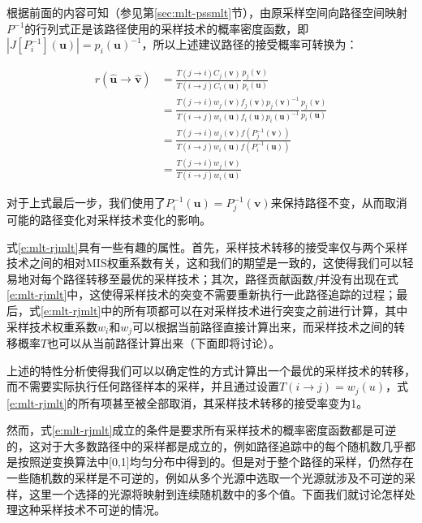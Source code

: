 根据前面的内容可知（参见第\ref{sec:mlt-pssmlt}节），由原采样空间向路径空间映射$P^{-1}$的行列式正是该路径使用的采样技术的概率密度函数，即$|J[P^{-1}_i](\mathbf{u})|=p_i(\mathbf{u})^{-1}$，所以上述建议路径的接受概率可转换为：

\begin{equation}\label{e:mlt-rjmlt}
\begin{aligned}
	r(\hat{\mathbf{u}}\to\hat{\mathbf{v}})&=\frac{T(j\to i)C_j({\mathbf{v}})}{T(i\to j)C_i({\mathbf{u}})}\frac{p_j({\mathbf{v}})}{p_i({\mathbf{u}})}\\
	&=\frac{T(j\to i)w_j({\mathbf{v}})f_j({\mathbf{v}})p_j({\mathbf{v}})^{-1}}{T(i\to j)w_i({\mathbf{u}})f_i({\mathbf{u}})p_i({\mathbf{u}})^{-1}}\frac{p_j({\mathbf{v}})}{p_i({\mathbf{u}})}\\
	&=\frac{T(j\to i)w_j({\mathbf{v}})f(P^{-1}_j({\mathbf{v}}))}{T(i\to j)w_i({\mathbf{u}})f(P^{-1}_i({\mathbf{u}}))}\\
	&=\frac{T(j\to i)w_j({\mathbf{v}})}{T(i\to j)w_i({\mathbf{u}})}
\end{aligned}
\end{equation}

\noindent 对于上式最后一步，我们使用了$P^{-1}_i({\mathbf{u}})=P^{-1}_j({\mathbf{v}})$来保持路径不变，从而取消可能的路径变化对采样技术变化的影响。

式\ref{e:mlt-rjmlt}具有一些有趣的属性。首先，采样技术转移的接受率仅与两个采样技术之间的相对MIS权重系数有关，这和我们的期望是一致的，这使得我们可以轻易地对每个路径转移至最优的采样技术；其次，路径贡献函数$f$并没有出现在式\ref{e:mlt-rjmlt}中，这使得采样技术的突变不需要重新执行一此路径追踪的过程；最后，式\ref{e:mlt-rjmlt}中的所有项都可以在对采样技术进行突变之前进行计算，其中采样技术权重系数$w_i$和$w_j$可以根据当前路径直接计算出来，而采样技术之间的转移概率$T$也可以从当前路径计算出来（下面即将讨论）。

上述的特性分析使得我们可以以确定性的方式计算出一个最优的采样技术的转移，而不需要实际执行任何路径样本的采样，并且通过设置$T(i\to j)=w_j({u})$，式\ref{e:mlt-rjmlt}的所有项甚至被全部取消，其采样技术转移的接受率变为1。

然而，式\ref{e:mlt-rjmlt}成立的条件是要求所有采样技术的概率密度函数都是可逆的，这对于大多数路径中的采样都是成立的，例如路径追踪中的每个随机数几乎都是按照逆变换算法中[0,1]均匀分布中得到的。但是对于整个路径的采样，仍然存在一些随机数的采样是不可逆的，例如从多个光源中选取一个光源就涉及不可逆的采样，这里一个选择的光源将映射到连续随机数中的多个值。下面我们就讨论怎样处理这种采样技术不可逆的情况。




